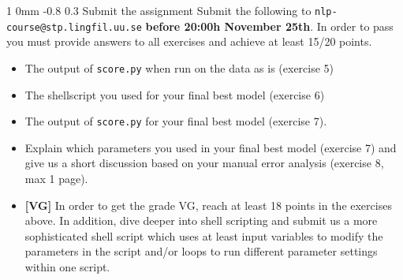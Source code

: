\documentclass[11pt]{article}
\makeatletter
\newcommand{\newsec}[2]{\section{#1}\label{sec:#2}\noindent}
\renewcommand{\section}{\@startsection
{section}%
{1}%
{0mm}%
{-0.8\baselineskip}%
{0.3\baselineskip}%
{\bfseries\large}}%
\makeatother
\begin{document}
\newsec{Submit the assignment}{submit}%
Submit the following to {\tt nlp-course@stp.lingfil.uu.se} \textbf{before 20:00h November 25th}. In order to pass you must provide answers to all exercises and achieve at least 15/20 points.
\begin{itemize}[noitemsep,topsep=0.2cm]
\item The output of {\tt score.py} when run on the data as is (exercise 5)
\item The shellscript you used for your final best model (exercise 6)
\item The output of {\tt score.py} for your final best model (exercise 7).
\item  Explain which parameters you used in your final best model (exercise 7)
and give us a short discussion based on your manual error analysis (exercise 8, max 1 page).
\item \textbf{[VG]} In order to get the grade VG, reach at least 18 points in the exercises above. In addition, dive deeper into shell scripting and submit us a more sophisticated shell script which uses at least input variables to modify the parameters in the script and/or loops to run different parameter settings within one script.
\end{itemize}
\end{document}
